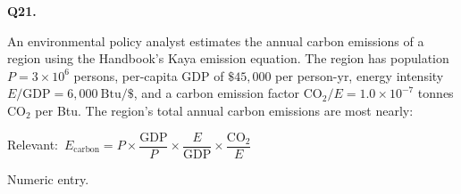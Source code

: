 \documentclass[11pt]{article}
\begin{document}
\vspace{9pt}
\filbreak
\textbf{\color{accent}Q21.}\par\vspace{2pt}
An environmental policy analyst estimates the annual carbon emissions of a region using the Handbook's Kaya emission equation. The region has population $P = 3 \times 10^6$ persons, per-capita GDP of $\$45{,}000$ per person-yr, energy intensity $E/\text{GDP} = 6{,}000\ \text{Btu}/\$$, and a carbon emission factor $\text{CO}_2/E = 1.0 \times 10^{-7}$ tonnes $\text{CO}_2$ per Btu. The region's total annual carbon emissions are most nearly:\par\par\vspace{3pt}
{\small\color{soft}Relevant:}\ $E_{\text{carbon}} = P \times \dfrac{\text{GDP}}{P} \times \dfrac{E}{\text{GDP}} \times \dfrac{\text{CO}_2}{E}$\par\vspace{3pt}
{\small\color{soft}Numeric entry.}\par\vspace{3pt}
\end{document}
